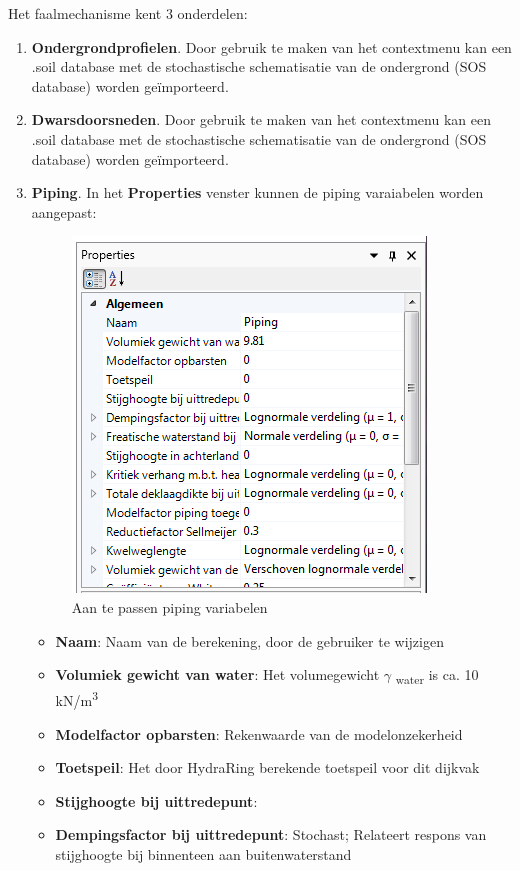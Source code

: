 Het faalmechanisme kent 3 onderdelen:
\begin{enumerate}
\item \textbf{Ondergrondprofielen}. Door gebruik te maken van het contextmenu kan een .soil database met de stochastische schematisatie van de
ondergrond (SOS database) worden ge\"{i}mporteerd.
\item \textbf{Dwarsdoorsneden}. Door gebruik te maken van het contextmenu kan een .soil database met de stochastische schematisatie van de
ondergrond (SOS database) worden ge\"{i}mporteerd.
\item \textbf{Piping}. In het \textbf{Properties} venster kunnen de piping varaiabelen worden aangepast:
\begin{figure} [H]
	\centering
		\includegraphics{figures/chapter_piping/PipingProperties}
	\caption{Aan te passen piping variabelen}
	\label{fig:fig5.5}
\end{figure}
	\begin{itemize}
	\item \textbf{Naam}: Naam van de berekening, door de gebruiker te wijzigen
	\item \textbf{Volumiek gewicht van water}: Het volumegewicht  $\gamma$ \textsubscript{water}  is ca. 10 kN/m\textsuperscript{3}
	\item \textbf{Modelfactor opbarsten}: Rekenwaarde van de modelonzekerheid
	\item \textbf{Toetspeil}: Het door HydraRing berekende toetspeil voor dit dijkvak
	\item \textbf{Stijghoogte bij uittredepunt}: 
	\item \textbf{Dempingsfactor bij uittredepunt}: Stochast; Relateert respons van stijghoogte bij binnenteen aan buitenwaterstand

\end{itemize}
\end{enumerate}
